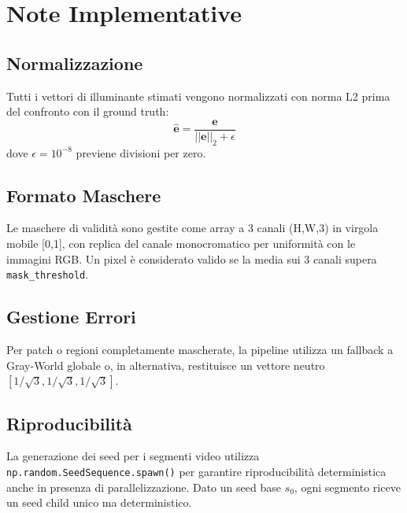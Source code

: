 \section{Note Implementative}\label{app:implementation_notes}

\subsection{Normalizzazione}
Tutti i vettori di illuminante stimati vengono normalizzati con norma L2 prima del confronto con il ground truth:
\begin{equation}
\hat{\mathbf{e}} = \frac{\mathbf{e}}{||\mathbf{e}||_2 + \epsilon}
\end{equation}
dove $\epsilon = 10^{-8}$ previene divisioni per zero.

\subsection{Formato Maschere}
Le maschere di validità sono gestite come array a 3 canali (H,W,3) in virgola mobile [0,1], con replica del canale monocromatico per uniformità con le immagini RGB. Un pixel è considerato valido se la media sui 3 canali supera \texttt{mask\_threshold}.

\subsection{Gestione Errori}
Per patch o regioni completamente mascherate, la pipeline utilizza un fallback a Gray-World globale o, in alternativa, restituisce un vettore neutro $[1/\sqrt{3}, 1/\sqrt{3}, 1/\sqrt{3}]$.

\subsection{Riproducibilità}
La generazione dei seed per i segmenti video utilizza \texttt{np.random.SeedSequence.spawn()} per garantire riproducibilità deterministica anche in presenza di parallelizzazione. Dato un seed base $s_0$, ogni segmento riceve un seed child unico ma deterministico.
